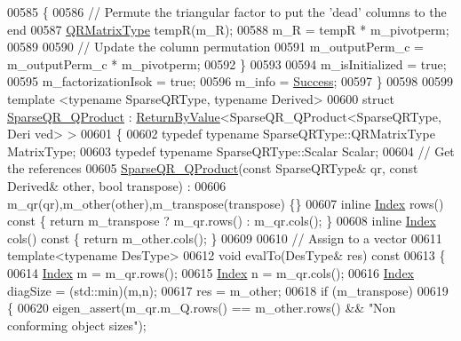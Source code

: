 \begin{DoxyCode}
00585   \{
00586     \textcolor{comment}{// Permute the triangular factor to put the 'dead' columns to the end}
00587     \hyperlink{group___sparse_core___module}{QRMatrixType} tempR(m\_R);
00588     m\_R = tempR * m\_pivotperm;
00589     
00590     \textcolor{comment}{// Update the column permutation}
00591     m\_outputPerm\_c = m\_outputPerm\_c * m\_pivotperm;
00592   \}
00593   
00594   m\_isInitialized = \textcolor{keyword}{true}; 
00595   m\_factorizationIsok = \textcolor{keyword}{true};
00596   m\_info = \hyperlink{group__enums_gga85fad7b87587764e5cf6b513a9e0ee5ea52581b035f4b59c203b8ff999ef5fcea}{Success};
00597 \}
00598 
00599 \textcolor{keyword}{template} <\textcolor{keyword}{typename} SparseQRType, \textcolor{keyword}{typename} Derived>
00600 \textcolor{keyword}{struct }\hyperlink{struct_eigen_1_1_sparse_q_r___q_product}{SparseQR\_QProduct} : \hyperlink{group___core___module_class_eigen_1_1_return_by_value}{ReturnByValue}<SparseQR\_QProduct<SparseQRType, Deri
      ved> >
00601 \{
00602   \textcolor{keyword}{typedef} \textcolor{keyword}{typename} SparseQRType::QRMatrixType MatrixType;
00603   \textcolor{keyword}{typedef} \textcolor{keyword}{typename} SparseQRType::Scalar Scalar;
00604   \textcolor{comment}{// Get the references }
00605   \hyperlink{struct_eigen_1_1_sparse_q_r___q_product}{SparseQR\_QProduct}(\textcolor{keyword}{const} SparseQRType& qr, \textcolor{keyword}{const} Derived& other, \textcolor{keywordtype}{bool} transpose) : 
00606   m\_qr(qr),m\_other(other),m\_transpose(transpose) \{\}
00607   \textcolor{keyword}{inline} \hyperlink{namespace_eigen_a62e77e0933482dafde8fe197d9a2cfde}{Index} rows()\textcolor{keyword}{ const }\{ \textcolor{keywordflow}{return} m\_transpose ? m\_qr.rows() : m\_qr.cols(); \}
00608   \textcolor{keyword}{inline} \hyperlink{namespace_eigen_a62e77e0933482dafde8fe197d9a2cfde}{Index} cols()\textcolor{keyword}{ const }\{ \textcolor{keywordflow}{return} m\_other.cols(); \}
00609   
00610   \textcolor{comment}{// Assign to a vector}
00611   \textcolor{keyword}{template}<\textcolor{keyword}{typename} DesType>
00612   \textcolor{keywordtype}{void} evalTo(DesType& res)\textcolor{keyword}{ const}
00613 \textcolor{keyword}{  }\{
00614     \hyperlink{namespace_eigen_a62e77e0933482dafde8fe197d9a2cfde}{Index} m = m\_qr.rows();
00615     \hyperlink{namespace_eigen_a62e77e0933482dafde8fe197d9a2cfde}{Index} n = m\_qr.cols();
00616     \hyperlink{namespace_eigen_a62e77e0933482dafde8fe197d9a2cfde}{Index} diagSize = (std::min)(m,n);
00617     res = m\_other;
00618     \textcolor{keywordflow}{if} (m\_transpose)
00619     \{
00620       eigen\_assert(m\_qr.m\_Q.rows() == m\_other.rows() && \textcolor{stringliteral}{"Non conforming object sizes"});

\end{DoxyCode}
